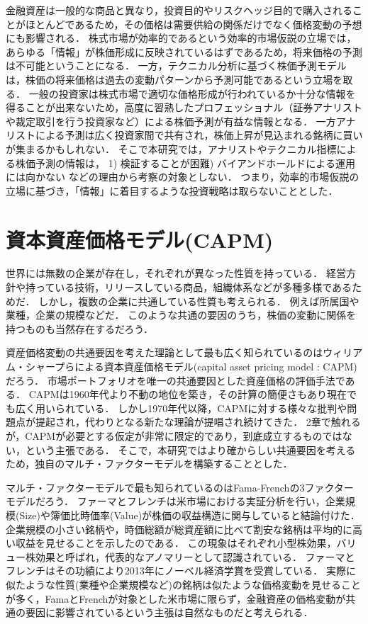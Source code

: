 \documentclass[11pt]{jreport}
\begin{document}
金融資産は一般的な商品と異なり，投資目的やリスクヘッジ目的で購入されることがほとんどであるため，その価格は需要供給の関係だけでなく価格変動の予想にも影響される．
株式市場が効率的であるという効率的市場仮説の立場では，あらゆる「情報」が株価形成に反映されているはずであるため，将来価格の予測は不可能ということになる．
一方，テクニカル分析に基づく株価予測モデルは，株価の将来価格は過去の変動パターンから予測可能であるという立場を取る．
一般の投資家は株式市場で適切な価格形成が行われているか十分な情報を得ることが出来ないため，高度に習熟したプロフェッショナル（証券アナリストや裁定取引を行う投資家など）による株価予測が有益な情報となる．
一方アナリストによる予測は広く投資家間で共有され，株価上昇が見込まれる銘柄に買いが集まるかもしれない．
そこで本研究では，アナリストやテクニカル指標による株価予測の情報は，
1) 検証することが困難) バイアンドホールドによる運用には向かない\quad
などの理由から考察の対象としない．
つまり，効率的市場仮説の立場に基づき，「情報」に着目するような投資戦略は取らないこととした．

\section{資本資産価格モデル(CAPM)}
世界には無数の企業が存在し，それぞれが異なった性質を持っている．
経営方針や持っている技術，リリースしている商品，組織体系などが多種多様であるためだ．
しかし，複数の企業に共通している性質も考えられる．
例えば所属国や業種，企業の規模などだ．
このような共通の要因のうち，株価の変動に関係を持つものも当然存在するだろう．

資産価格変動の共通要因を考えた理論として最も広く知られているのはウィリアム・シャープらによる資本資産価格モデル(capital asset pricing model : CAPM)だろう．
市場ポートフォリオを唯一の共通要因とした資産価格の評価手法である．
CAPMは1960年代より不動の地位を築き，その計算の簡便さもあり現在でも広く用いられている．
しかし1970年代以降，CAPMに対する様々な批判や問題点が提起され，代わりとなる新たな理論が提唱され続けてきた．
2章で触れるが，CAPMが必要とする仮定が非常に限定的であり，到底成立するものではない，という主張である．
そこで，本研究ではより確からしい共通要因を考えるため，独自のマルチ・ファクターモデルを構築することとした．

マルチ・ファクターモデルで最も知られているのはFama-Frenchの3ファクターモデル\cite{Fama}だろう．
ファーマとフレンチは米市場における実証分析を行い，企業規模(Size)や簿価比時価率(Value)が株価の収益構造に関与していると結論付けた．
企業規模の小さい銘柄や，時価総額が総資産額に比べて割安な銘柄は平均的に高い収益を見せることを示したのである．
この現象はそれぞれ小型株効果，バリュー株効果と呼ばれ，代表的なアノマリーとして認識されている．
ファーマとフレンチはその功績により2013年にノーベル経済学賞を受賞している．
実際に似たような性質(業種や企業規模など)の銘柄は似たような価格変動を見せることが多く，FamaとFrenchが対象とした米市場に限らず，金融資産の価格変動が共通の要因に影響されているという主張は自然なものだと考えられる．
\end{document}
